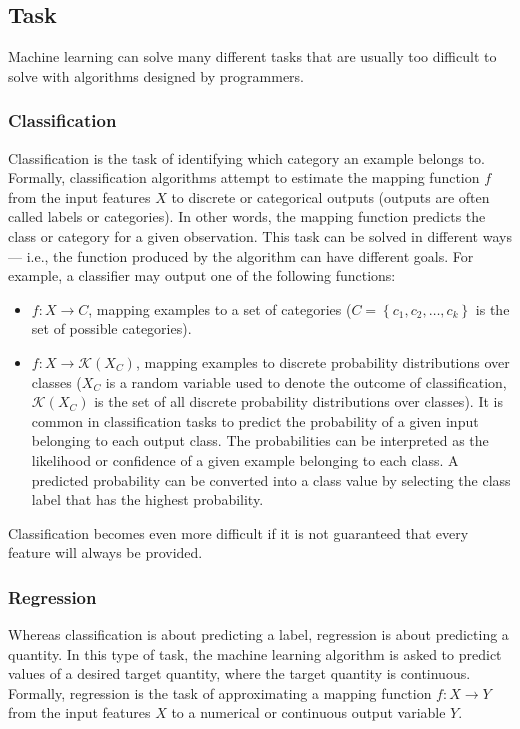         \subsection{Task}
            Machine learning can solve many different tasks that are usually too difficult to solve with algorithms designed by programmers.
            \subsubsection{Classification}\label{classification}
                Classification is the task of identifying which category an example belongs to. Formally, classification algorithms attempt to estimate the mapping function \(f\) from the input features \(X\) to discrete or categorical outputs (outputs are often called labels or categories). In other words, the mapping function predicts the class or category for a given observation. This task can be solved in different ways --- i.e., the function produced by the algorithm can have different goals. For example, a classifier may output one of the following functions:
                \begin{itemize}
                    \item \(f: X \rightarrow C\), mapping examples to a set of categories (\(C = \left\{c_{1}, c_{2}, \dots , c_{k}\right\}\) is the set of possible categories).
                    \item \(f: X \rightarrow \mathcal{K}\left(X_{C}\right)\), mapping examples to discrete probability distributions over classes (\(X_{C}\) is a random variable used to denote the outcome of classification, \(\mathcal{K}\left(X_{C}\right)\) is the set of all discrete probability distributions over classes). It is common in classification tasks to predict the probability of a given input belonging to each output class. The probabilities can be interpreted as the likelihood or confidence of a given example belonging to each class. A predicted probability can be converted into a class value by selecting the class label that has the highest probability.
                \end{itemize}
                Classification becomes even more difficult if it is not guaranteed that every feature will always be provided.
            \subsubsection{Regression}
                Whereas classification is about predicting a label, regression is about predicting a quantity. In this type of task, the machine learning algorithm is asked to predict values of a desired target quantity, where the target quantity is continuous. Formally, regression is the task of approximating a mapping function \(f: X \rightarrow Y\) from the input features \(X\) to a numerical or continuous output variable \(Y\).
